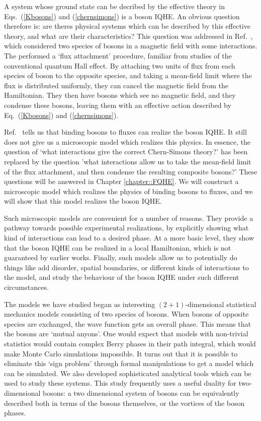 A system whose ground state can be decribed by the effective theory in Eqs.~(\ref{Kbosons}) and (\ref{chernsimons}) is a boson IQHE. An obvious question therefore is: are theres physical systems which can be described by this effective theory, and what are their characteristics? This question was addressed in Ref.~\cite{SenthilLevin2012}, which considered two species of bosons in a magnetic field with some interactions. The performed a `flux attachment' procedure, familiar from studies of the conventional quantum Hall effect. By attaching two units of flux from each species of boson to the opposite species, and taking a mean-field limit where the flux is distributed uniformly, they can cancel the magnetic field from the Hamiltonian. They then have bosons which see no magnetic field, and they condense these bosons, leaving them with an effective action described by Eq.~(\ref{Kbosons}) and (\ref{chernsimons}). 

Ref.~\cite{SenthilLevin2012} tells us that binding bosons to fluxes can realize the boson IQHE. It still does not give us a microscopic model which realizes this physics. In essence, the question of `what interactions give the correct Chern-Simons theory?' has been replaced by the question 'what interactions allow us to take the mean-field limit of the flux attachment, and then condense the resulting composite bosons?' These questions will be answered in Chapter \ref{chapter::FQHE}. We will construct a microscopic model which realizes the physics of binding bosons to fluxes, and we will show that this model realizes the boson IQHE.

Such microscopic models are convenient for a number of reasons. They provide a pathway towards possible experimental realizations, by explicitly showing what kind of interactions can lead to a desired phase. At a more basic level, they show that the boson IQHE can be realized in a local Hamiltonian, which is not guaranteed by earlier works. Finally, such models allow us to potentially do things like add disorder, spatial boundaries, or different kinds of interactions to the model, and study the behaviour of the boson IQHE under such different circumstances. 

The models we have studied began as interesting $(2+1)$-dimensional statistical mechanics models consisting of two species of bosons. When bosons of opposite species are exchanged, the wave function gets an overall phase. This means that the bosons are `mutual anyons'. One would expect that models with non-trivial statistics would contain complex Berry phases in their path integral, which would make Monte Carlo simulations impossible. It turns out that it is possible to eliminate this `sign problem' through formal manipulations to get a model which can be simulated. We also developed sophisticated analytical tools which can be used to study these systems. This study frequently uses a useful duality for two-dimensional bosons: a two dimensional system of bosons can be equivalently described both in terms of the bosons themselves, or the vortices of the boson phases.

